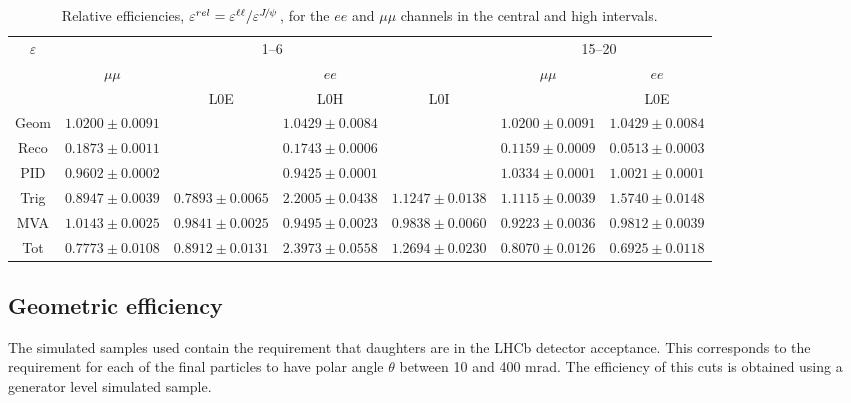 \begin{landscape}
\begin{table}
\centering
\caption{Relative efficiencies, $\varepsilon^{rel} = \varepsilon^{\ell\ell} / \varepsilon^{\jpsi}$,
for the $ee$ and $\mu\mu$ channels in the central and high \qsq intervals.}
\begin{tabular}{|c|c|c|c|c|c|c|}
\hline \multirow{3}{*}{$\varepsilon$}  			&  \multicolumn{4}{c|}{1--6~\gevgevcccc}  				& \multicolumn {2}{c|}{15--20~\gevgevcccc}  \\ \cline{2-7}
 				&	  $\mu\mu$  				& \multicolumn {3}{c|}{$ee$} 			&  $\mu\mu$  				& \multicolumn {1}{c|}{$ee$} \\ \cline{2-7}
				&   &  L0E 	& L0H 	& L0I    &  	& L0E 	\\ \hline
Geom  & $ 1.0200 \pm 0.0091$ & \multicolumn{3}{c|}{$ 1.0429 \pm 0.0084$} & $ 1.0200 \pm 0.0091$ & \multicolumn{1}{c|}{$ 1.0429 \pm 0.0084$} \\
Reco  & $ 0.1873 \pm 0.0011$ & \multicolumn{3}{c|}{$ 0.1743 \pm 0.0006$} & $ 0.1159 \pm 0.0009$ & \multicolumn{1}{c|}{$ 0.0513 \pm 0.0003$} \\
PID  & $ 0.9602 \pm 0.0002$ & \multicolumn{3}{c|}{$ 0.9425 \pm 0.0001$} & $ 1.0334 \pm 0.0001$ & \multicolumn{1}{c|}{$ 1.0021 \pm 0.0001$} \\
\hline
Trig  & $ 0.8947 \pm 0.0039 $ & $ 0.7893 \pm 0.0065 $ & $ 2.2005 \pm 0.0438 $ & $ 1.1247 \pm 0.0138 $ & $ 1.1115 \pm 0.0039 $ & $ 1.5740 \pm 0.0148 $ \\ 
MVA  & $ 1.0143 \pm 0.0025 $ & $ 0.9841 \pm 0.0025 $ & $ 0.9495 \pm 0.0023 $ & $ 0.9838 \pm 0.0060 $ & $ 0.9223 \pm 0.0036 $ & $ 0.9812 \pm 0.0039 $ \\  
\hline
Tot  & $ 0.7773 \pm 0.0108 $ & $ 0.8912 \pm 0.0131 $ & $ 2.3973 \pm 0.0558 $ & $ 1.2694 \pm 0.0230 $ & $ 0.8070 \pm 0.0126 $ & $ 0.6925 \pm 0.0118 $ \\  
\hline
\end{tabular}\label{tab:RKst_releff}
\end{table}

\end{landscape}


\subsection{Geometric efficiency}


The simulated samples used contain the requirement that daughters are in the LHCb
detector acceptance. This corresponds to the requirement for each of the final particles
to have polar angle $\theta$ between 10 and 400 mrad. The efficiency of this
cuts is obtained using a generator level simulated sample.

